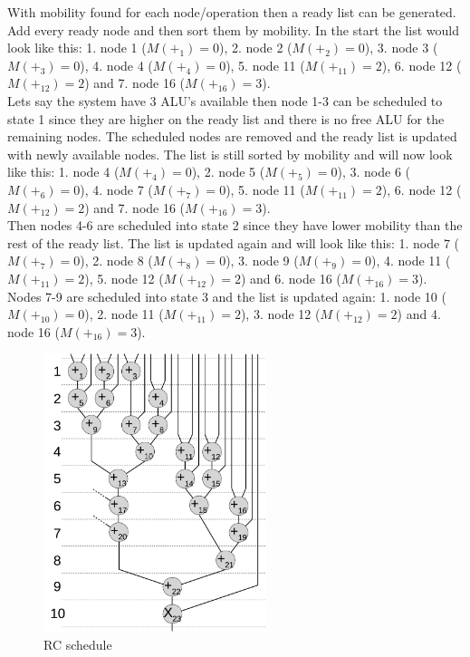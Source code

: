 With mobility found for each node/operation then a ready list can be generated. Add every ready node and then sort them by mobility. In the start the list would look like this: 1. node 1 ($M(+_1)=0$), 2. node 2 ($M(+_2)=0$), 3. node 3 ($M(+_3)=0$), 4. node 4 ($M(+_4)=0$), 5. node 11 ($M(+_{11})=2$), 6. node 12 ($M(+_{12})=2$) and 7. node 16 ($M(+_{16})=3$).\\

Lets say the system have 3 ALU's available then node 1-3 can be scheduled to state 1 since they are higher on the ready list and there is no free ALU for the remaining nodes. The scheduled nodes are removed and the ready list is updated with newly available nodes. The list is still sorted by mobility and will now look like this: 1. node 4 ($M(+_4)=0$), 2. node 5 ($M(+_5)=0$), 3. node 6 ($M(+_6)=0$), 4. node 7 ($M(+_7)=0$), 5. node 11 ($M(+_{11})=2$), 6. node 12 ($M(+_{12})=2$) and 7. node 16 ($M(+_{16})=3$). \\

Then nodes 4-6 are scheduled into state 2 since they have lower mobility than the rest of the ready list. The list is updated again and will look like this: 1. node 7 ($M(+_7)=0$), 2. node 8 ($M(+_8)=0$), 3. node 9 ($M(+_9)=0$), 4. node 11 ($M(+_{11})=2$), 5. node 12 ($M(+_{12})=2$) and 6. node 16 ($M(+_{16})=3$).\\

Nodes 7-9 are scheduled into state 3 and the list is updated again: 1. node 10 ($M(+_10)=0$), 2. node 11 ($M(+_{11})=2$), 3. node 12 ($M(+_{12})=2$) and 4. node 16 ($M(+_{16})=3$).\\
\begin{figure}[ht!]
  \centering
  \includegraphics[height=8.125cm]{figures/pc3alu.jpg}
  \caption{RC schedule}
  \label{fig:rc3alu}
\end{figure}


